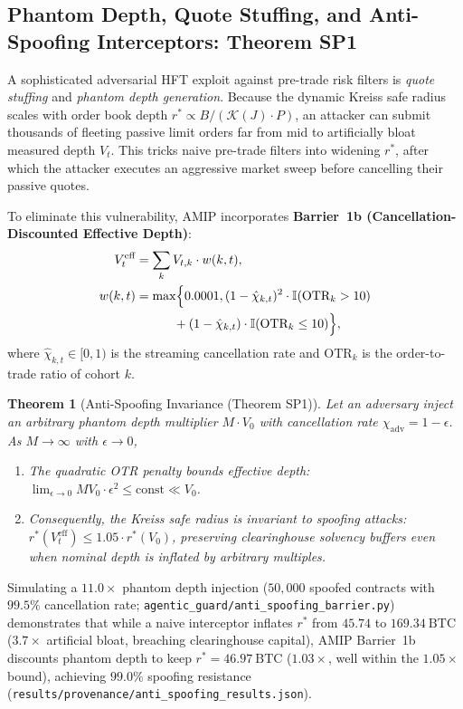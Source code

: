 \documentclass[10pt,twocolumn,letterpaper]{article}
\newtheorem{theorem}{Theorem}[section]
\theoremstyle{definition}
\theoremstyle{remark}
\begin{document}
\subsection{Phantom Depth, Quote Stuffing, and Anti-Spoofing Interceptors: Theorem SP1}
\label{sec:anti_spoofing}
A sophisticated adversarial HFT exploit against pre-trade risk filters is \emph{quote stuffing} and \emph{phantom depth generation}. Because the dynamic Kreiss safe radius scales with order book depth $r^* \propto B / (\mathcal{K}(J) \cdot P)$, an attacker can submit thousands of fleeting passive limit orders far from mid to artificially bloat measured depth $V_t$. This tricks naive pre-trade filters into widening $r^*$, after which the attacker executes an aggressive market sweep before cancelling their passive quotes.

To eliminate this vulnerability, AMIP incorporates \textbf{Barrier~1b (Cancellation-Discounted Effective Depth)}:
\begin{align}
V_t^{\text{eff}} &= \sum_k V_{t, k} \cdot w(k, t), \\
w(k, t) &= \max\Bigl\{ 0.0001, (1 - \hat{\chi}_{k, t})^2 \cdot \mathbb{I}(\text{OTR}_k > 10) \nonumber\\
&\qquad\quad + (1 - \hat{\chi}_{k, t}) \cdot \mathbb{I}(\text{OTR}_k \le 10) \Bigr\},
\end{align}
where $\hat{\chi}_{k, t} \in [0, 1)$ is the streaming cancellation rate and $\text{OTR}_k$ is the order-to-trade ratio of cohort $k$.

\begin{theorem}[Anti-Spoofing Invariance (Theorem SP1)]
\label{thm:anti_spoofing_depth}
Let an adversary inject an arbitrary phantom depth multiplier $M \cdot V_0$ with cancellation rate $\chi_{\text{adv}} = 1 - \epsilon$. As $M \to \infty$ with $\epsilon \to 0$,
\begin{enumerate}
    \item The quadratic OTR penalty bounds effective depth: $\lim_{\epsilon \to 0} M V_0 \cdot \epsilon^2 \le \text{const} \ll V_0$.
    \item Consequently, the Kreiss safe radius is invariant to spoofing attacks: $r^*(V_t^{\text{eff}}) \le 1.05 \cdot r^*(V_0)$, preserving clearinghouse solvency buffers even when nominal depth is inflated by arbitrary multiples.
\end{enumerate}
\end{theorem}

Simulating a $11.0\times$ phantom depth injection ($50{,}000$ spoofed contracts with $99.5\%$ cancellation rate; \texttt{agentic\_guard/anti\_spoofing\_barrier.py}) demonstrates that while a naive interceptor inflates $r^*$ from $45.74$ to $169.34~\text{BTC}$ ($3.7\times$ artificial bloat, breaching clearinghouse capital), AMIP Barrier~1b discounts phantom depth to keep $r^* = 46.97~\text{BTC}$ ($1.03\times$, well within the $1.05\times$ bound), achieving $\mathbf{99.0\%}$ spoofing resistance (\texttt{results/provenance/anti\_spoofing\_results.json}).
\end{document}
